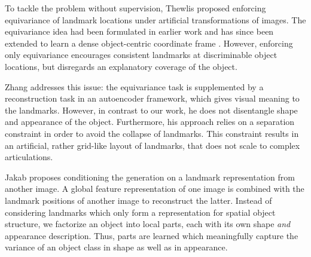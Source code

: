 	To tackle the problem without supervision, Thewlis \etal \cite{thewlis17} proposed enforcing equivariance of landmark locations under artificial transformations of images. The equivariance idea had been formulated in earlier work \cite{lenc16covariant} and has since been extended to learn a dense object-centric coordinate frame \cite{thewlis17dense}. However, enforcing only equivariance encourages consistent landmarks at %
	discriminable object locations,
	but disregards an explanatory coverage of the object.

	Zhang \etal \cite{zhang18} addresses this issue: the equivariance task is supplemented by a reconstruction task in an autoencoder framework, which gives visual meaning to the landmarks. However, in contrast to our work, he does not disentangle shape and appearance of the object. Furthermore, his approach relies on a separation constraint in order to avoid the collapse of landmarks.
	This constraint results in an artificial, rather grid-like layout of landmarks, that does not scale to complex articulations.

	Jakab \etal \cite{jakab18} proposes conditioning the generation on a landmark representation from another image. A global feature representation of one image is combined with the landmark positions of another image to reconstruct the latter. Instead of considering landmarks which only form a representation for spatial object structure, we factorize an object into local parts, each with its own shape \textit{and} appearance description.
	Thus, parts are learned which meaningfully capture the variance of an object class in shape as well as in appearance.

